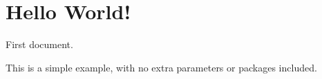 \documentclass[12pt]{article}
\begin{document}
\thispagestyle{empty}
\vspace*{2in}
\section*{Hello World!}
\begin{flushleft}
  { \large
    First document.
    
    This is a simple example, with no
    extra parameters or packages included.
  }
\end{flushleft}
\end{document}
